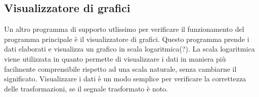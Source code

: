 \subsection{Visualizzatore di grafici}
\label{pyvis}
Un altro programma di supporto utlissimo per verificare il funzionamento del
programma principale \`e il visualizzatore di grafici. Questo programma prende i
dati elaborati e visualizza un grafico in scala logaritmica(?). La scala
logaritmica viene utilizzata in quanto permette di visualizzare i dati in
maniera pi\`u facilmente comprensibile rispetto ad una scala naturale, senza
cambiarne il significato. Visualizzare i dati \`e un modo semplice per
verificare la correttezza delle trasformazioni, se il segnale trasformato \`e
noto.

